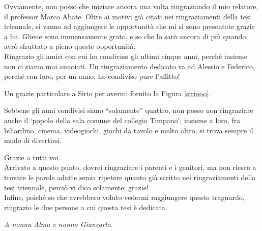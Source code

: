 Ovviamente, non posso che iniziare ancora una volta ringraziando il mio relatore, il professor Marco Abate. Oltre ai motivi già citati nei ringraziamenti della tesi triennale, si vanno ad aggiungere le opportunità che mi si sono presentate grazie a lui. Gliene sono immensamente grato, e so che lo sarò ancora di più quando avrò sfruttato a pieno queste opportunità.\\

Ringrazio gli amici con cui ho condiviso gli ultimi cinque anni, perché insieme non ci siamo mai annoiati. Un ringraziamento dedicato va ad Alessio e Federico, perché con loro, per un anno, ho condiviso pure l'affitto!

Un grazie particolare a Sirio per avermi fornito la Figura \ref{siriooo}.

Sebbene gli anni condivisi siano ``solamente'' quattro, non posso non ringraziare anche il `popolo della sala comune del collegio Timpano'; insieme a loro, fra biliardino, cinema, videogiochi, giochi da tavolo e molto altro, si trova sempre il modo di divertirsi.

Grazie a tutti voi.\\

Arrivato a questo punto, dovrei ringraziare i parenti e i genitori, ma non riesco a trovare le parole adatte senza ripetere quanto già scritto nei ringraziamenti della tesi triennale, perciò vi dico solamente: grazie!\\

Infine, poiché so che avrebbero voluto vedermi raggiungere questo traguardo, ringrazio le due persone a cui questa tesi è dedicata.

\textit{A nonna Alma e nonno Giancarlo.}